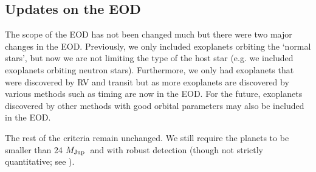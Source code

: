 \documentclass[11pt,preprint]{aastex}
\def\mjup{$M_{\rm Jup}$}
\begin{document}
\begin{CJK*}{UTF8}{gbsn}
\begin{comment}
As the number of exoplanet discoveries keeps rising, it is important
to keep track of these discoveries and cataloging the orbital
parameters and host star properties of exoplanet systems. There are
several entities that are devoted to this effort, including the
Exoplanet Orbit Database (EOD) and Exoplanets Data Explorer\footnote{See
  \url{http://exoplanets.org}.} \citep{Wright2011}, the Extrasolar
Planets Encyclopaedia\footnote{See \url{http://exoplanet.eu}.}
\citep{Schneider2011}, the NASA Exoplanet Archive\footnote{See
  \url{http://exoplanetarchive.ipac.caltech.edu}.}
\citep{Akeson2013}, and so on.

This paper describes the continuing efforts since \cite{Wright2011} to
maintain the EOD and the Exoplanets Data Explorer at exoplanets.org.

The efforts of keeping track of exoplanet discoveries are being
carried out by several entities, and most notably, the Extrasolar
Planets Encyclopaedia\footnote{See \url{http://exoplanet.eu}.}
\citep{Schneider2011}, the NASA Exoplanet Archive\footnote{See
  \url{http://exoplanetarchive.ipac.caltech.edu}.}
\citep{Akeson2013}, and the Exoplanet Orbit Database (EOD) and
Exoplanets Data Explorer\footnote{See \url{http://exoplanets.org}.}
\citep{Wright2011}.
\end{comment}


\section{Updates on the EOD}\label{sec:update}

The scope of the EOD has not been changed much but there were two major changes in the EOD. Previously, we only included exoplanets orbiting the `normal stars', but now we are not limiting the type of the host star (e.g. we included exoplanets orbiting neutron stars). Furthermore, we only had exoplanets that were discovered by RV and transit but as more exoplanets are discovered by various methods such as timing are now in the EOD. For the future, exoplanets discovered by other methods with good orbital parameters may also be included in the EOD. 

The rest of the criteria remain unchanged. We still require the planets to be smaller than 24 \mjup\ and with robust detection (though not strictly quantitative; see \citealt{Wright2011}).  


\end{CJK*}
\end{document}
